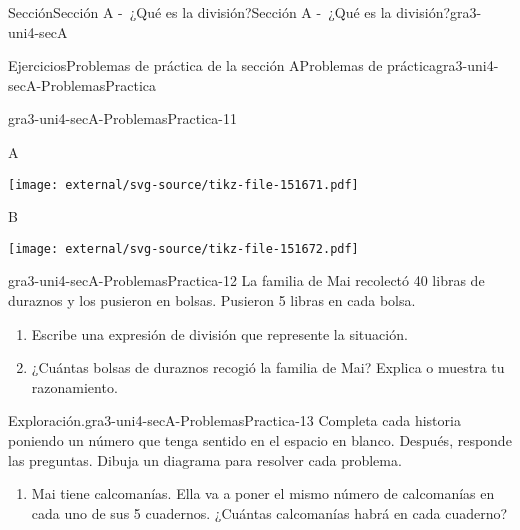 \documentclass[twoside,10pt,]{article}
\begin{document}
\begin{sectionptx}{Sección}{Sección A -~¿Qué es la división?}{}{Sección A -~¿Qué es la división?}{}{}{gra3-uni4-secA}
\begin{exercises-subsection}{Ejercicios}{Problemas de práctica de la sección A}{}{Problemas de práctica}{}{}{gra3-uni4-secA-ProblemasPractica}
\begin{divisionexercise}{9}{}{}{gra3-uni4-secA-ProblemasPractica-11}
\begin{enumerate}[label=(\alph*)]
\begin{sidebyside}{2}{0}{0}{0}%
\begin{sbspanel}{0.05}%
A%
\end{sbspanel}%
\begin{sbspanel}{0.95}%
\texttt{[image: external/svg-source/tikz-file-151671.pdf]}
\end{sbspanel}%
\end{sidebyside}%
\begin{sidebyside}{2}{0}{0}{0}%
\begin{sbspanel}{0.05}%
B%
\end{sbspanel}%
\begin{sbspanel}{0.95}%
\texttt{[image: external/svg-source/tikz-file-151672.pdf]}
\end{sbspanel}%
\end{sidebyside}%
\end{enumerate}
%
\end{divisionexercise}%
\begin{divisionexercise}{10}{}{}{gra3-uni4-secA-ProblemasPractica-12}%
La familia de Mai recolectó 40 libras de duraznos y los pusieron en bolsas. Pusieron 5 libras en cada bolsa.%
\par
%
\begin{enumerate}[label=(\alph*)]
\item{}Escribe una expresión de división que represente la situación.%
\item{}¿Cuántas bolsas de duraznos recogió la familia de Mai? Explica o muestra tu razonamiento.%
\end{enumerate}
%
\end{divisionexercise}%
\begin{divisionexercise}{11}{Exploración.}{}{gra3-uni4-secA-ProblemasPractica-13}%
Completa cada historia poniendo un número que tenga sentido en el espacio en blanco. Después, responde las preguntas. Dibuja un diagrama para resolver cada problema.%
\par
%
\begin{enumerate}[label=(\alph*)]
\item{}Mai tiene \textunderscore{}\textunderscore{}\textunderscore{}\textunderscore{}\textunderscore{}\textunderscore{}\textunderscore{}\textunderscore{}\textunderscore{}\textunderscore{} calcomanías. Ella va a poner el mismo número de calcomanías en cada uno de sus 5 cuadernos. ¿Cuántas calcomanías habrá en cada cuaderno?%

\end{enumerate}
\end{divisionexercise}
\end{exercises-subsection}
\end{sectionptx}
\end{document}
